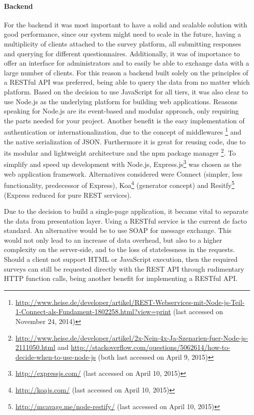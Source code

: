 	\paragraph{Backend}

		For the backend it was most important to have a solid and scalable solution with good performance, since our system might need to scale in the future, having a multiplicity of clients attached to the survey platform, all submitting responses and querying for different questionnaires. Additionally, it was of importance to offer an interface for administrators and to easily be able to exchange data with a large number of clients. For this reason a backend built solely on the principles of a RESTful API was preferred, being able to query the data from no matter which platform.
		Based on the decision to use JavaScript for all tiers, it was also clear to use Node.js as the underlying platform for building web applications. Reasons speaking for Node.js are its event-based and modular approach, only requiring the parts needed for your project. Another benefit is the easy implementation of authentication or internationalization, due to the concept of middlewares \footnote{\url{http://www.heise.de/developer/artikel/REST-Webservices-mit-Node-js-Teil-1-Connect-als-Fundament-1802258.html?view=print} (last accessed on November 24, 2014)} and the native serialization of JSON. Furthermore it is great for reusing code, due to its modular and lightweight architecture and the npm package manager \footnote{\url{http://www.heise.de/developer/artikel/2x-Nein-4x-Ja-Szenarien-fuer-Node-js-2111050.html} and \url{http://stackoverflow.com/questions/5062614/how-to-decide-when-to-use-node-js} (both last accessed on April 9, 2015)}. To simplify and speed up development with Node.js, Express.js\footnote{\url{http://expressjs.com/} (last accessed on April 10, 2015)} was chosen as the web application framework. Alternatives considered were Connect (simpler, less functionality, predecessor of Express), Koa\footnote{\url{http://koajs.com/} (last accessed on April 10, 2015)} (generator concept) and Resitfy\footnote{\url{http://mcavage.me/node-restify/} (last accessed on April 10, 2015)} (Express reduced for pure REST services). 

		Due to the decision to build a single-page application, it became vital to separate the data from presentation layer. Using a RESTful service is the current de facto standard. An alternative would be to use SOAP for message exchange. This would not only lead to an increase of data overhead, but also to a higher complexity on the server-side, and to the loss of statelessness in the requests. Should a client not support HTML or JavaScript execution, then the required surveys can still be requested directly with the REST API through rudimentary HTTP function calls, being another benefit for implementing a RESTful API.

